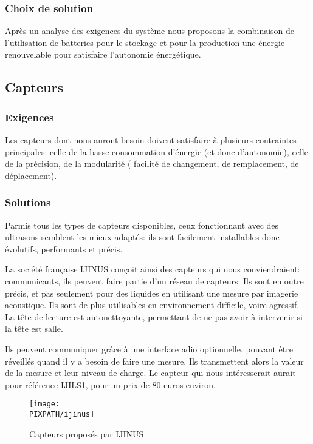 \subsubsection{Choix de solution}
Après un analyse des exigences du système nous proposons la combinaison de l'utilisation de batteries pour le stockage et pour la production une énergie renouvelable pour satisfaire l'autonomie énergétique.

\subsection{Capteurs}

    \subsubsection{Exigences}
    Les capteurs dont nous auront besoin doivent satisfaire à plusieurs
    contraintes principales: celle de la basse consommation d'énergie
    (et donc d'autonomie), celle de la précision, de la modularité (
    facilité de changement, de remplacement, de déplacement).

    \subsubsection{Solutions}
    Parmis tous les types de capteurs disponibles, ceux fonctionnant avec des
    ultrasons semblent les mieux adaptés: ils sont facilement installables donc
    évolutifs, performants et précis.

    La société française IJINUS conçoit ainsi des capteurs qui nous
    conviendraient: communicants, ils peuvent faire partie d'un
    réseau de capteurs. Ils sont en outre précis, et pas seulement
    pour des liquides en utilisant une mesure par imagerie acoustique.
    Ils sont de plus utilisables en environnement difficile, voire agressif.
    La tête de lecture est autonettoyante, permettant de ne pas avoir
    à intervenir si la tête est salle.

    Ils peuvent communiquer grâce à une interface adio optionnelle, pouvant
    être réveillés quand il y a besoin de faire une mesure. Ils transmettent
    alors la valeur de la mesure et leur niveau de charge.
    Le capteur qui nous intéresserait aurait pour référence IJILS1, pour
    un prix de 80 euros environ.

    \begin{figure}[!h]
    \begin{center}
    \texttt{[image: \\PIXPATH/ijinus]}
    \caption{Capteurs proposés par IJINUS}
    \end{center}
    \end{figure}

